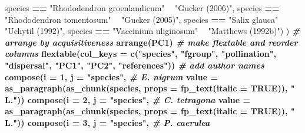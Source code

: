 \documentclass[
]{article}
\newenvironment{Shaded}{\begin{snugshade}}{\end{snugshade}}
\newcommand{\CommentTok}[1]{\textcolor[rgb]{0.56,0.35,0.01}{\textit{#1}}}
\newcommand{\DataTypeTok}[1]{\textcolor[rgb]{0.13,0.29,0.53}{#1}}
\newcommand{\DecValTok}[1]{\textcolor[rgb]{0.00,0.00,0.81}{#1}}
\newcommand{\KeywordTok}[1]{\textcolor[rgb]{0.13,0.29,0.53}{\textbf{#1}}}
\newcommand{\NormalTok}[1]{#1}
\newcommand{\OperatorTok}[1]{\textcolor[rgb]{0.81,0.36,0.00}{\textbf{#1}}}
\newcommand{\OtherTok}[1]{\textcolor[rgb]{0.56,0.35,0.01}{#1}}
\newcommand{\StringTok}[1]{\textcolor[rgb]{0.31,0.60,0.02}{#1}}
\begin{document}
\begin{Shaded}
\begin{Highlighting}[]
{{{{{{{{{{\NormalTok{                                 species }\OperatorTok{==}\StringTok{ "Rhododendron groenlandicum"} \OperatorTok{~}\StringTok{ "Gucker (2006)"}\NormalTok{,}
\NormalTok{                                 species }\OperatorTok{==}\StringTok{ "Rhododendron tomentosum"} \OperatorTok{~}\StringTok{ "Gucker (2005)"}\NormalTok{,}
\NormalTok{                                 species }\OperatorTok{==}\StringTok{ "Salix glauca"} \OperatorTok{~}\StringTok{ "Uchytil (1992)"}\NormalTok{,}
\NormalTok{                                 species }\OperatorTok{==}\StringTok{ "Vaccinium uliginosum"} \OperatorTok{~}\StringTok{ "Matthews (1992b)"}\NormalTok{)}
\NormalTok{          ) }\OperatorTok{%>%}\StringTok{ }
\StringTok{  }
\StringTok{  }\CommentTok{# arrange by acquisitiveness}
\StringTok{  }\KeywordTok{arrange}\NormalTok{(PC1) }\OperatorTok{%>%}\StringTok{ }
\StringTok{  }
\StringTok{  }\CommentTok{# make flextable and reorder columns}
\StringTok{  }\KeywordTok{flextable}\NormalTok{(}\DataTypeTok{col_keys =} \KeywordTok{c}\NormalTok{(}\StringTok{"species"}\NormalTok{, }\StringTok{"fgroup"}\NormalTok{, }\StringTok{"pollination"}\NormalTok{, }\StringTok{"dispersal"}\NormalTok{, }\StringTok{"PC1"}\NormalTok{, }\StringTok{"PC2"}\NormalTok{, }\StringTok{"references"}\NormalTok{)) }\OperatorTok{%>%}\StringTok{ }
\StringTok{  }
\StringTok{  }\CommentTok{# add author names}
\StringTok{  }\KeywordTok{compose}\NormalTok{(}\DataTypeTok{i =} \DecValTok{1}\NormalTok{, }\DataTypeTok{j =} \StringTok{"species"}\NormalTok{,   }\CommentTok{# E. nigrum}
          \DataTypeTok{value =} \KeywordTok{as_paragraph}\NormalTok{(}\KeywordTok{as_chunk}\NormalTok{(species,}
                                        \DataTypeTok{props =} \KeywordTok{fp_text}\NormalTok{(}\DataTypeTok{italic =} \OtherTok{TRUE}\NormalTok{)),}
                               \StringTok{" L."}\NormalTok{)) }\OperatorTok{%>%}\StringTok{ }
\StringTok{  }\KeywordTok{compose}\NormalTok{(}\DataTypeTok{i =} \DecValTok{2}\NormalTok{, }\DataTypeTok{j =} \StringTok{"species"}\NormalTok{,   }\CommentTok{# C. tetragona}
          \DataTypeTok{value =} \KeywordTok{as_paragraph}\NormalTok{(}\KeywordTok{as_chunk}\NormalTok{(species,}
                                        \DataTypeTok{props =} \KeywordTok{fp_text}\NormalTok{(}\DataTypeTok{italic =} \OtherTok{TRUE}\NormalTok{)),}
                               \StringTok{" L."}\NormalTok{)) }\OperatorTok{%>%}\StringTok{ }
\StringTok{  }\KeywordTok{compose}\NormalTok{(}\DataTypeTok{i =} \DecValTok{3}\NormalTok{, }\DataTypeTok{j =} \StringTok{"species"}\NormalTok{,   }\CommentTok{# P. caerulea}
}}}}}}}}}}}}}}}
\end{Highlighting}
\end{Shaded}
\end{document}
